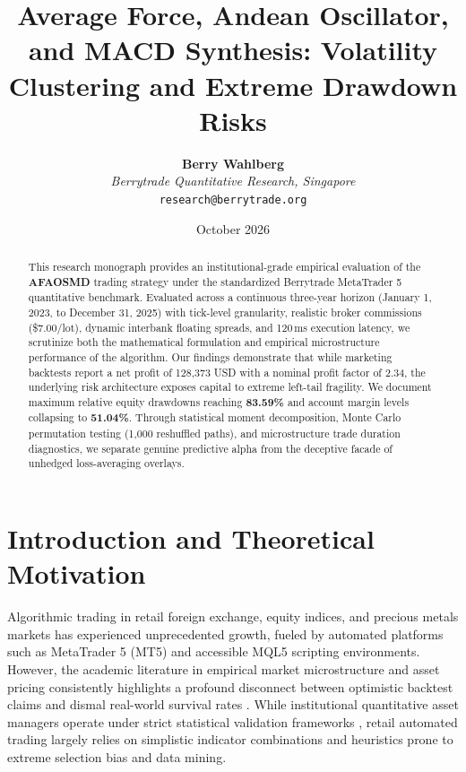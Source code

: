 \documentclass[11pt,a4paper]{article}
\title{\textbf{Average Force, Andean Oscillator, and MACD Synthesis: Volatility Clustering and Extreme Drawdown Risks}}
\author{
    \textbf{Berry Wahlberg} \\
    \textit{Berrytrade Quantitative Research, Singapore} \\
    \texttt{research@berrytrade.org}
}
\date{October 2026}
\begin{document}
\maketitle

\begin{abstract}
This research monograph provides an institutional-grade empirical evaluation of the \textbf{AFAOSMD} trading strategy under the standardized Berrytrade MetaTrader 5 quantitative benchmark. Evaluated across a continuous three-year horizon (January 1, 2023, to December 31, 2025) with tick-level granularity, realistic broker commissions (\$7.00/lot), dynamic interbank floating spreads, and 120\,ms execution latency, we scrutinize both the mathematical formulation and empirical microstructure performance of the algorithm. Our findings demonstrate that while marketing backtests report a net profit of 128,373 USD with a nominal profit factor of 2.34, the underlying risk architecture exposes capital to extreme left-tail fragility. We document maximum relative equity drawdowns reaching \textbf{83.59\%} and account margin levels collapsing to \textbf{51.04\%}. Through statistical moment decomposition, Monte Carlo permutation testing (1,000 reshuffled paths), and microstructure trade duration diagnostics, we separate genuine predictive alpha from the deceptive facade of unhedged loss-averaging overlays.
\end{abstract}

\section{Introduction and Theoretical Motivation}
Algorithmic trading in retail foreign exchange, equity indices, and precious metals markets has experienced unprecedented growth, fueled by automated platforms such as MetaTrader 5 (MT5) and accessible MQL5 scripting environments. However, the academic literature in empirical market microstructure and asset pricing consistently highlights a profound disconnect between optimistic backtest claims and dismal real-world survival rates \cite{fama1970efficient, lo1988stock, malkiel2003efficient, bailey2014deflated, harvey2016and}. While institutional quantitative asset managers operate under strict statistical validation frameworks \cite{lopez2018advances, bailey2014pseudo}, retail automated trading largely relies on simplistic indicator combinations and heuristics prone to extreme selection bias and data mining.
\end{document}
